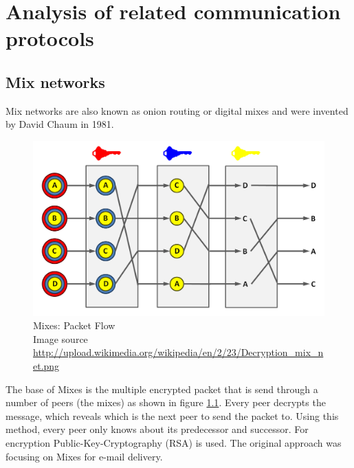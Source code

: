 \chapter{Analysis of related communication protocols}
\label{commprotocols}

\section{Mix networks}
Mix networks are also known as onion routing or digital mixes and
were invented by David Chaum in 1981.\cite{Chaum:1981:UEM:358549.358563}
\begin{figure}
    \centering
    \caption[Mixes: Packet Flow]{Mixes: Packet Flow\\Image source \url{http://upload.wikimedia.org/wikipedia/en/2/23/Decryption_mix_net.png}}
    \label{mixesflow}
    \includegraphics[scale=0.3]{Decryption_mix_net.png}
\end{figure}
The base of Mixes is the multiple encrypted packet that is send through a
number of peers (the mixes) as shown in figure \ref{mixesflow}.
Every peer decrypts the message, which reveals which is the next peer
to send the packet to. Using this method, every peer only knows about
its predecessor and successor. For encryption Public-Key-Cryptography (RSA) is used.
The original approach was focusing on Mixes for e-mail delivery.
